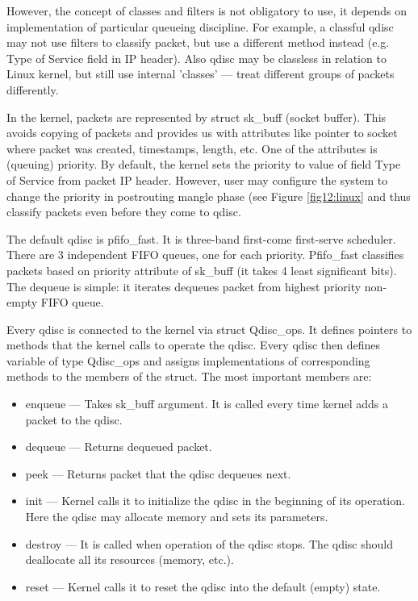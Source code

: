 However, the concept of classes and filters is not obligatory to use, it depends on implementation of particular queueing discipline. For example, a classful qdisc may not use filters to classify packet, but use a different method instead (e.g. Type of Service field in IP header). Also qdisc may be classless in relation to Linux kernel, but still use internal 'classes' --- treat different groups of packets differently.

In the kernel, packets are represented by struct sk\_buff (socket buffer). This avoids copying of packets and provides us with attributes like pointer to socket where packet was created, timestamps, length, etc. One of the attributes is (queuing) priority. By default, the kernel sets the priority to value of field Type of Service from packet IP header. However, user may configure the system to change the priority in postrouting mangle phase (see Figure \ref{fig12:linux} and thus classify packets even before they come to qdisc.

The default qdisc is pfifo\_fast. It is three-band first-come first-serve scheduler. There are 3 independent FIFO queues, one for each priority. Pfifo\_fast classifies packets based on priority attribute of sk\_buff (it takes 4 least significant bits). The dequeue is simple: it iterates dequeues packet from highest priority non-empty FIFO queue.

Every qdisc is connected to the kernel via struct Qdisc\_ops. It defines pointers to methods that the kernel calls to operate the qdisc. Every qdisc then defines variable of type Qdisc\_ops and assigns implementations of corresponding methods to the members of the struct. The most important members are:
\begin{itemize}
	\item enqueue --- Takes sk\_buff argument. It is called every time kernel adds a packet to the qdisc.
	\item dequeue --- Returns dequeued packet.
	\item peek --- Returns packet that the qdisc dequeues next.
	\item init --- Kernel calls it to initialize the qdisc in the beginning of its operation. Here the qdisc may allocate memory and sets its parameters.
	\item destroy --- It is called when operation of the qdisc stops. The qdisc should deallocate all its resources (memory, etc.).
	\item reset --- Kernel calls it to reset the qdisc into the default (empty) state.
\end{itemize}

